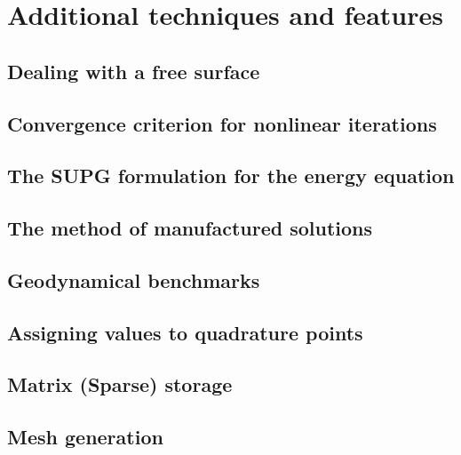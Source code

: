 \documentclass[a4paper]{article}
\begin{document}
\newpage
\section{Additional techniques and features} %


\subsection{Dealing with a free surface}

\subsection{Convergence criterion for nonlinear iterations}


\newpage %
\subsection{The SUPG formulation for the energy equation} \label{sec:supg}  %
\newpage %
\subsection{The method of manufactured solutions \label{mms}}  %
\newpage %
\subsection{Geodynamical benchmarks}  %
\newpage %
\subsection{Assigning values to quadrature points}  %
\newpage %
\subsection{Matrix (Sparse) storage}  %
\newpage %
\subsection{Mesh generation} \label{subsection_meshes}  %
\newpage %
\end{document}
